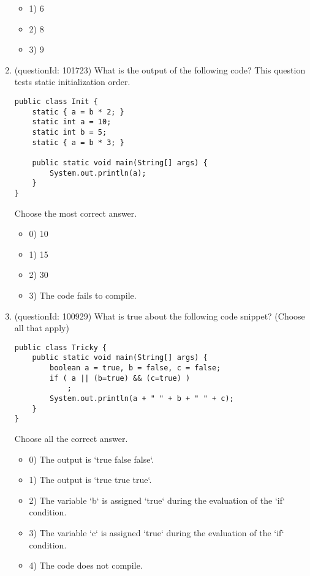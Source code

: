 \documentclass[12pt]{article}
\begin{document}
\begin{enumerate}[label=(\arabic*)]
\begin{itemize}
\item 1) 6

\item 2) 8

\item 3) 9

\end{itemize}
\item (questionId: 101723) What is the output of the following code? This question tests static initialization order.\n\begin{verbatim}
public class Init {
    static { a = b * 2; }
    static int a = 10;
    static int b = 5;
    static { a = b * 3; }

    public static void main(String[] args) {
        System.out.println(a);
    }
}
\end{verbatim}
Choose the most correct answer. 
\begin{itemize}
\item 0) 10

\item 1) 15

\item 2) 30

\item 3) The code fails to compile.

\end{itemize}
\item (questionId: 100929) What is true about the following code snippet? (Choose all that apply)\n\begin{verbatim}
public class Tricky {
    public static void main(String[] args) {
        boolean a = true, b = false, c = false;
        if ( a || (b=true) && (c=true) )
            ;
        System.out.println(a + " " + b + " " + c);
    }
}
\end{verbatim}
Choose all the correct answer.\begin{itemize}
\item 0) The output is `true false false`.

\item 1) The output is `true true true`.

\item 2) The variable `b` is assigned `true` during the evaluation of the `if` condition.

\item 3) The variable `c` is assigned `true` during the evaluation of the `if` condition.

\item 4) The code does not compile.


\end{itemize}
\end{enumerate}
\end{document}

